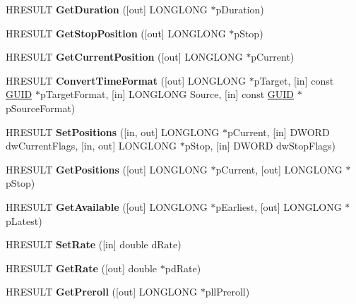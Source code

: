 \begin{DoxyCompactItemize}
H\+R\+E\+S\+U\+LT {\bfseries Get\+Duration} (\mbox{[}out\mbox{]} L\+O\+N\+G\+L\+O\+NG $\ast$p\+Duration)
\item 
\mbox{\label{interface_i_media_seeking_ac623dcc7d5ce92fc3f1ed5853c74c73d}} 
H\+R\+E\+S\+U\+LT {\bfseries Get\+Stop\+Position} (\mbox{[}out\mbox{]} L\+O\+N\+G\+L\+O\+NG $\ast$p\+Stop)
\item 
\mbox{\label{interface_i_media_seeking_ac041917d03aad73832c7f5bb846ed265}} 
H\+R\+E\+S\+U\+LT {\bfseries Get\+Current\+Position} (\mbox{[}out\mbox{]} L\+O\+N\+G\+L\+O\+NG $\ast$p\+Current)
\item 
\mbox{\label{interface_i_media_seeking_a0fd9a6303ff85495fc88556bef58615a}} 
H\+R\+E\+S\+U\+LT {\bfseries Convert\+Time\+Format} (\mbox{[}out\mbox{]} L\+O\+N\+G\+L\+O\+NG $\ast$p\+Target, \mbox{[}in\mbox{]} const \hyperlink{interface_g_u_i_d}{G\+U\+ID} $\ast$p\+Target\+Format, \mbox{[}in\mbox{]} L\+O\+N\+G\+L\+O\+NG Source, \mbox{[}in\mbox{]} const \hyperlink{interface_g_u_i_d}{G\+U\+ID} $\ast$p\+Source\+Format)
\item 
\mbox{\label{interface_i_media_seeking_a387ecdc0f303b7e2aadfeae99ad7e48e}} 
H\+R\+E\+S\+U\+LT {\bfseries Set\+Positions} (\mbox{[}in, out\mbox{]} L\+O\+N\+G\+L\+O\+NG $\ast$p\+Current, \mbox{[}in\mbox{]} D\+W\+O\+RD dw\+Current\+Flags, \mbox{[}in, out\mbox{]} L\+O\+N\+G\+L\+O\+NG $\ast$p\+Stop, \mbox{[}in\mbox{]} D\+W\+O\+RD dw\+Stop\+Flags)
\item 
\mbox{\label{interface_i_media_seeking_aabee3357fb6a91a478444d55d54e91fe}} 
H\+R\+E\+S\+U\+LT {\bfseries Get\+Positions} (\mbox{[}out\mbox{]} L\+O\+N\+G\+L\+O\+NG $\ast$p\+Current, \mbox{[}out\mbox{]} L\+O\+N\+G\+L\+O\+NG $\ast$p\+Stop)
\item 
\mbox{\label{interface_i_media_seeking_a0e788a3c1ece1da9744763575dfc0472}} 
H\+R\+E\+S\+U\+LT {\bfseries Get\+Available} (\mbox{[}out\mbox{]} L\+O\+N\+G\+L\+O\+NG $\ast$p\+Earliest, \mbox{[}out\mbox{]} L\+O\+N\+G\+L\+O\+NG $\ast$p\+Latest)
\item 
\mbox{\label{interface_i_media_seeking_a78d604049888b54bfad8f2100427c975}} 
H\+R\+E\+S\+U\+LT {\bfseries Set\+Rate} (\mbox{[}in\mbox{]} double d\+Rate)
\item 
\mbox{\label{interface_i_media_seeking_a97efccd9a7e16f0e7dfe79978172807d}} 
H\+R\+E\+S\+U\+LT {\bfseries Get\+Rate} (\mbox{[}out\mbox{]} double $\ast$pd\+Rate)
\item 
\mbox{\label{interface_i_media_seeking_a553c3c4c9519275b9451b5af7334bb43}} 
H\+R\+E\+S\+U\+LT {\bfseries Get\+Preroll} (\mbox{[}out\mbox{]} L\+O\+N\+G\+L\+O\+NG $\ast$pll\+Preroll)
\end{DoxyCompactItemize}
